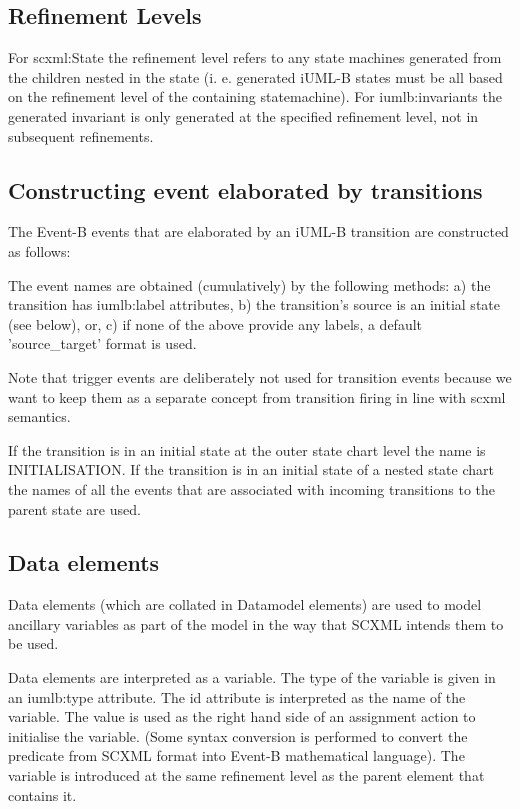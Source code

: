 \subsection{Refinement Levels}
For scxml:State the refinement level refers to any state 
machines generated from the children nested in the state (i.
e. generated iUML-B states must be all based on the 
refinement level of the containing statemachine).
For iumlb:invariants the generated invariant is only 
generated at the specified refinement level, not in 
subsequent refinements.

\subsection{Constructing event elaborated by transitions}
The Event-B events that are elaborated by an iUML-B 
transition are constructed as follows:

The event names are obtained (cumulatively) by the 
following methods:
a)  the transition has iumlb:label attributes,
b) the transition's source is an initial state (see below), 
or,
c) if none of the above provide any labels, a default 
'source\_target' format is used.

Note that trigger events are deliberately not used for 
transition events because we want to keep them as a 
separate concept from transition firing in line with scxml 
semantics.

If the transition is in an initial state at the outer state 
chart level the name is INITIALISATION. 
If the transition is in an initial state of a nested state 
chart the names of all the events that are associated with 
incoming transitions to the parent state are used.

\subsection{Data elements}
Data elements (which are collated in Datamodel elements) 
are used to model ancillary variables as part of the model 
in the way that SCXML intends them to be used.

Data elements are interpreted as a variable. The type of 
the variable is given in an iumlb:type attribute. 
The id attribute is interpreted as the name of the 
variable. The value is used as the right hand side of an 
assignment action to initialise the variable.  (Some syntax 
conversion is performed to convert the predicate from SCXML 
format into Event-B mathematical language). The variable is 
introduced at the same refinement level as the parent 
element that contains it.

